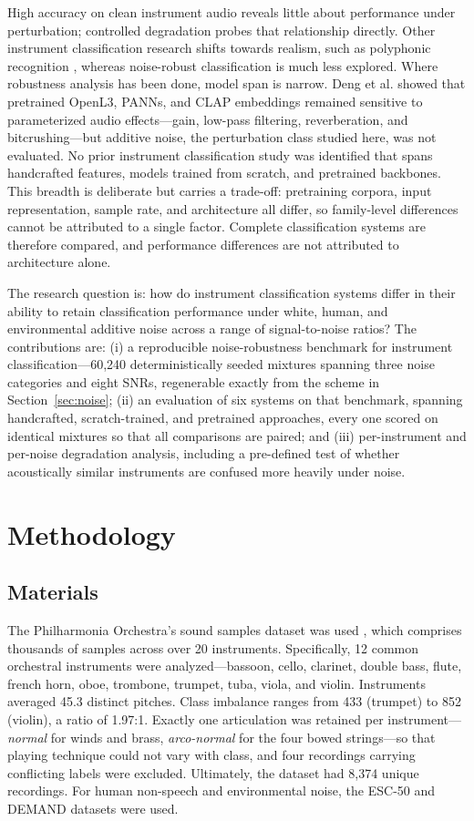 \documentclass[conference]{IEEEtran}
\begin{document}
High accuracy on clean instrument audio reveals little about performance under perturbation; controlled degradation probes that relationship directly. Other instrument classification research shifts towards realism, such as polyphonic recognition \cite{b9}, whereas noise-robust classification is much less explored. Where robustness analysis has been done, model span is narrow. Deng et al. \cite{b10} showed that pretrained OpenL3, PANNs, and CLAP embeddings remained sensitive to parameterized audio effects---gain, low-pass filtering, reverberation, and bitcrushing---but additive noise, the perturbation class studied here, was not evaluated. No prior instrument classification study was identified that spans handcrafted features, models trained from scratch, and pretrained backbones. This breadth is deliberate but carries a trade-off: pretraining corpora, input representation, sample rate, and architecture all differ, so family-level differences cannot be attributed to a single factor. Complete classification systems are therefore compared, and performance differences are not attributed to architecture alone.

The research question is: how do instrument classification systems differ in their ability to retain classification performance under white, human, and environmental additive noise across a range of signal-to-noise ratios? The contributions are: (i) a reproducible noise-robustness benchmark for instrument classification---60,240 deterministically seeded mixtures spanning three noise categories and eight SNRs, regenerable exactly from the scheme in Section~\ref{sec:noise}; (ii) an evaluation of six systems on that benchmark, spanning handcrafted, scratch-trained, and pretrained approaches, every one scored on identical mixtures so that all comparisons are paired; and (iii) per-instrument and per-noise degradation analysis, including a pre-defined test of whether acoustically similar instruments are confused more heavily under noise.


\section{Methodology}

\subsection{Materials}
The Philharmonia Orchestra's sound samples dataset was used \cite{b11}, which comprises thousands of samples across over 20 instruments. Specifically, 12 common orchestral instruments were analyzed---bassoon, cello, clarinet, double bass, flute, french horn, oboe, trombone, trumpet, tuba, viola, and violin. Instruments averaged 45.3 distinct pitches. Class imbalance ranges from 433 (trumpet) to 852 (violin), a ratio of 1.97:1. Exactly one articulation was retained per instrument---\textit{normal} for winds and brass, \textit{arco-normal} for the four bowed strings---so that playing technique could not vary with class, and four recordings carrying conflicting labels were excluded. Ultimately, the dataset had 8,374 unique recordings. For human non-speech and environmental noise, the ESC-50 \cite{b12} and DEMAND \cite{b13} datasets were used.
\end{document}
